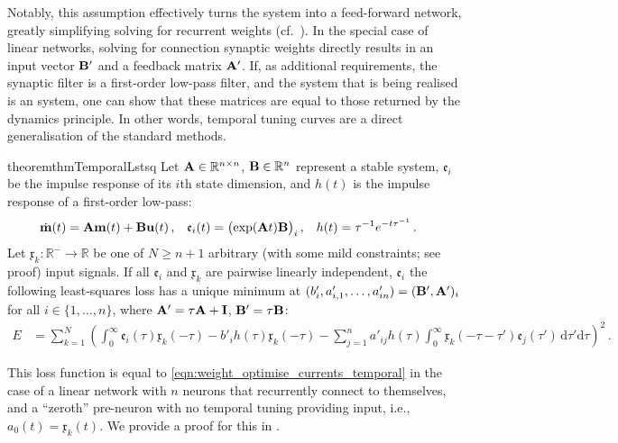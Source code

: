 Notably, this assumption effectively turns the system into a feed-forward network, greatly simplifying solving for recurrent weights (cf.~).
In the special case of linear networks, solving for connection synaptic weights directly results in an input vector $\mathbf{B}'$ and a feedback matrix $\mathbf{A}'$.
If, as additional requirements, the synaptic filter is a first-order low-pass filter, and the system that is being realised is an \LTI system, one can show that these matrices are equal to those returned by the \NEF dynamics principle.
In other words, temporal tuning curves are a direct generalisation of the standard \NEF methods.

\begin{restatable}{theorem}{thmTemporalLstsq}
	\label{thm:temporal_lstsq}
	Let $\mathbf{A} \in \mathbb{R}^{n \times n}$, $\mathbf{B} \in \mathbb{R}^n$ represent a stable \LTI system, $\mathfrak{e}_i$ be the impulse response of its $i$th state dimension, and $h(t)$ is the impulse response of a first-order low-pass:
	\begin{align*}
		  \dot{\mathbf{m}}(t) &= \mathbf{A} \mathbf{m}(t) + \mathbf{B} \mathbf{u}(t)  \,, 
		& \mathfrak{e}_i(t) &= \big(\!\exp( \mathbf{A} t ) \mathbf{B} \big)_i \,,
		& h(t) &= \tau^{-1} e^{-t \tau^{-1}} \,.
	\end{align*}
	Let $\mathfrak{x}_k : \mathbb{R}^- \to \mathbb{R}$ be one of $N \geq n + 1$ arbitrary (with some mild constraints; see proof) input signals.
	If all $\mathfrak{e}_i$ and $\mathfrak{x}_k$ are pairwise linearly independent, $\mathfrak{e}_i$ the following least-squares loss has a unique minimum at $(b'_{i}, a'_{i, 1}, \ldots, a'_{in}) = ( \mathbf{B}', \mathbf{A}' )_i$ for all $i \in \{1, \ldots, n\}$, where $\mathbf{A}' = \tau \mathbf{A} + \mathbf{I}$, $\mathbf{B}' = \tau \mathbf{B}$:
	\begin{align*}
		E &=\sum_{k = 1}^{N} \left(
					\int_{0}^{\infty} \!\! \mathfrak{e}_i(\tau) \mathfrak{x}_k(-\tau)
		          - b'_{i} h(\tau) \mathfrak{x}_k(-\tau)
		          - \sum_{j=1}^n a'_{ij} h(\tau) \int_0^\infty \!\! \mathfrak{x}_k(-\tau - \tau') \mathfrak{e}_j(\tau') \, \mathrm{d}\tau' \mathrm{d}\tau \right)^2 \,.
	\end{align*}
\end{restatable}
\noindent This loss function is equal to \cref{eqn:weight_optimise_currents_temporal} in the case of a linear network with $n$ neurons that recurrently connect to themselves, and a \enquote{zeroth} pre-neuron with no temporal tuning providing input, i.e., $a_0(t) = \mathfrak{x}_k(t)$.
We provide a proof for this in .

